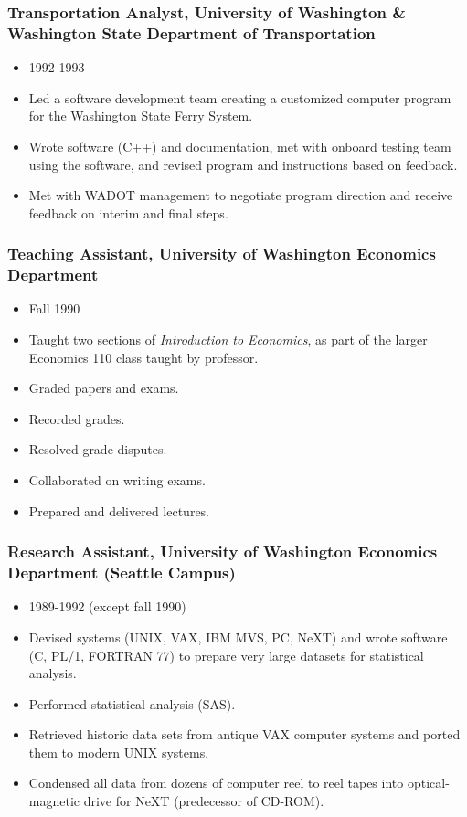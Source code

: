 \documentclass[12pt]{article}
\begin{document}
\subsubsection{Transportation Analyst, University of Washington \& Washington State Department of Transportation}

\begin{itemize}
\item
  1992-1993
\item
  Led a software development team creating a customized computer program
  for the Washington State Ferry System.
\item
  Wrote software (C++) and documentation, met with onboard testing team
  using the software, and revised program and instructions based on
  feedback.
\item
  Met with WADOT management to negotiate program direction and receive
  feedback on interim and final steps.
\end{itemize}

\subsubsection{Teaching Assistant, University of Washington
Economics
Department}

\begin{itemize}
\item
  Fall 1990
\item
  Taught two sections of \emph{Introduction to Economics}, as part of
  the larger Economics 110 class taught by professor.
\item
  Graded papers and exams.
\item
  Recorded grades.
\item
  Resolved grade disputes.
\item
  Collaborated on writing exams.
\item
  Prepared and delivered lectures.
\end{itemize}

\subsubsection{Research Assistant, University of Washington Economics Department (Seattle Campus)}

\begin{itemize}
\item
  1989-1992 (except fall 1990)
\item
  Devised systems (UNIX, VAX, IBM MVS, PC, NeXT) and wrote software (C,
  PL/1, FORTRAN 77) to prepare very large datasets for statistical
  analysis.
\item
  Performed statistical analysis (SAS).
\item
  Retrieved historic data sets from antique VAX computer systems and
  ported them to modern UNIX systems.
\item
  Condensed all data from dozens of computer reel to reel tapes into
  optical-magnetic drive for NeXT (predecessor of CD-ROM).
\end{itemize}
\end{document}
